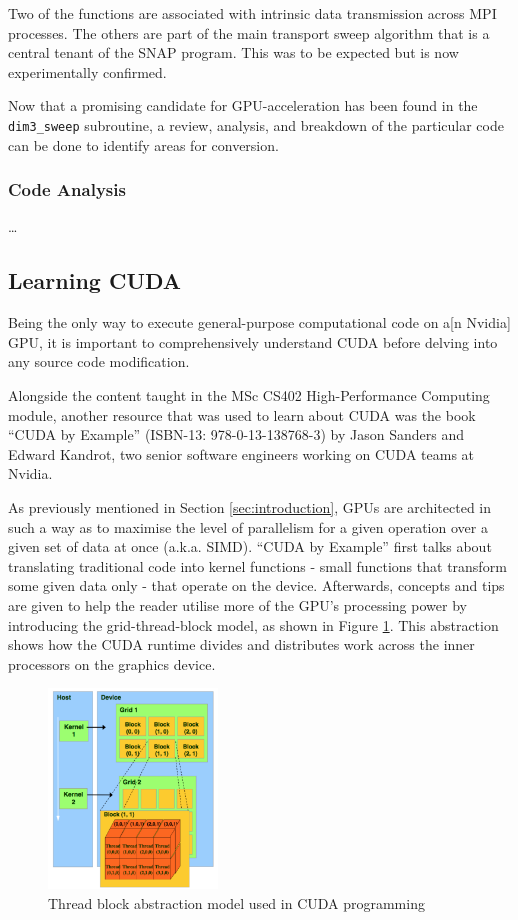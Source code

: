 \documentclass[conference]{IEEEtran}
\begin{document}
Two of the functions are associated with intrinsic data transmission across MPI processes. The others are part of the main transport sweep algorithm that is a central tenant of the SNAP program. This was to be expected but is now experimentally confirmed.

Now that a promising candidate for GPU-acceleration has been found in the \texttt{dim3\_sweep} subroutine, a review, analysis, and breakdown of the particular code can be done to identify areas for conversion.


\subsubsection{Code Analysis}

\dots

\subsection{Learning CUDA}

Being the only way to execute general-purpose computational code on a[n Nvidia] GPU, it is important to comprehensively understand CUDA before delving into any source code modification.

Alongside the content taught in the MSc CS402 High-Performance Computing module, another resource that was used to learn about CUDA was the book ``CUDA by Example'' (ISBN-13: 978-0-13-138768-3) by Jason Sanders and Edward Kandrot, two senior software engineers working on CUDA teams at Nvidia.

As previously mentioned in Section \ref{sec:introduction}, GPUs are architected in such a way as to maximise the level of parallelism for a given operation over a given set of data at once (a.k.a. SIMD). ``CUDA by Example'' first talks about translating traditional code into kernel functions - small functions that transform some given data only - that operate on the device. Afterwards, concepts and tips are given to help the reader utilise more of the GPU's processing power by introducing the grid-thread-block model, as shown in Figure \ref{fig:gridblockthread}. This abstraction shows how the CUDA runtime divides and distributes work across the inner processors on the graphics device.

\begin{figure}[!h]
    \centering
    \includegraphics[width=0.4\textwidth]{images/grid_block_thread.png}
    \caption{Thread block abstraction model used in CUDA programming}
    \label{fig:gridblockthread}
\end{figure}
\end{document}
